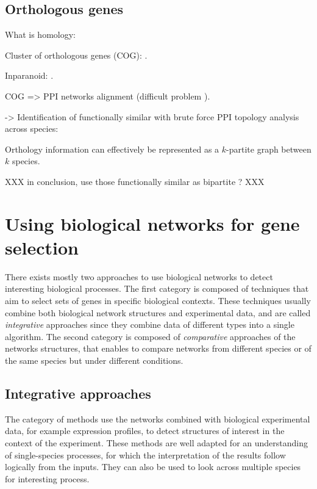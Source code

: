 	\subsection{Orthologous genes}
	\label{subsec:orthology}

	What is homology: \parencite{mccune2012using}

	Cluster of orthologous genes (COG): \parencite{tatusov1997genomic}.
	
	Inparanoid: \parencite{obrien2005inparanoid}.

	COG => PPI networks alignment (difficult problem \parencite{el2011lagrangian}).

	-> Identification of functionally similar with brute force PPI topology analysis across species: \parencite{bandyopadhyay2006systematic}


	Orthology information can effectively be represented as a $k$-partite graph between $k$ species.

	XXX in conclusion, use those functionally similar as bipartite ? XXX

\section{Using biological networks for gene selection}

There exists mostly two approaches to use biological networks to detect interesting biological processes.
The first category is composed of techniques that aim to select sets of genes in specific biological contexts.
These techniques usually combine both biological network structures and experimental data, and are called \emph{integrative} approaches since they combine data of different types into a single algorithm.
The second category is composed of \emph{comparative} approaches of the networks structures, that enables to compare networks from different species or of the same species but under different conditions.

	\subsection{Integrative approaches}

	The category of methods use the networks combined with biological experimental data, for example expression profiles, to detect structures of interest in the context of the experiment.
	These methods are well adapted for an understanding of single-species processes, for which the interpretation of the results follow logically from the inputs.
	They can also be used to look across multiple species for interesting process.


